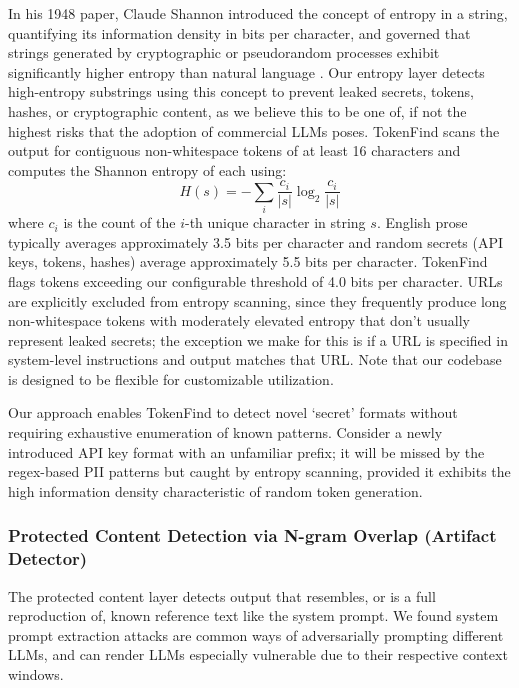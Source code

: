 \documentclass[11pt]{article}
\begin{document}
In his 1948 paper, Claude Shannon introduced the concept of entropy in a string, quantifying its
information density in bits per character, and governed that strings generated by cryptographic
or pseudorandom processes exhibit significantly higher entropy than natural language \citep{shannon1948mathematical}. Our
entropy layer detects high-entropy substrings using this concept to prevent leaked secrets, tokens,
hashes, or cryptographic content, as we believe this to be one of, if not the highest risks that the
adoption of commercial LLMs poses. TokenFind scans the output for contiguous non-whitespace
tokens of at least 16 characters and computes the Shannon entropy of each using:
\begin{equation}
H(s) = -\sum_{i} \frac{c_i}{|s|} \log_2 \frac{c_i}{|s|}
\label{eq:entropy}
\end{equation}
where $c_i$ is the count of the $i$-th unique character in string $s$. English prose typically averages
approximately 3.5 bits per character and random secrets (API keys, tokens, hashes) average approximately 5.5 bits per character. TokenFind flags tokens exceeding our configurable threshold of
4.0 bits per character. URLs are explicitly excluded from entropy scanning, since they frequently
produce long non-whitespace tokens with moderately elevated entropy that don't usually represent
leaked secrets; the exception we make for this is if a URL is specified in system-level instructions
and output matches that URL. Note that our codebase is designed to be flexible for customizable
utilization.

Our approach enables TokenFind to detect novel `secret' formats without requiring exhaustive
enumeration of known patterns. Consider a newly introduced API key format with an unfamiliar
prefix; it will be missed by the regex-based PII patterns but caught by entropy scanning, provided
it exhibits the high information density characteristic of random token generation.

\subsubsection{Protected Content Detection via N-gram Overlap (Artifact Detector)}
\label{sec:ngram-overlap}

The protected content layer detects output that resembles, or is a full reproduction of, known
reference text like the system prompt. We found system prompt extraction attacks are common
ways of adversarially prompting different LLMs, and can render LLMs especially vulnerable due to
their respective context windows.
\end{document}
